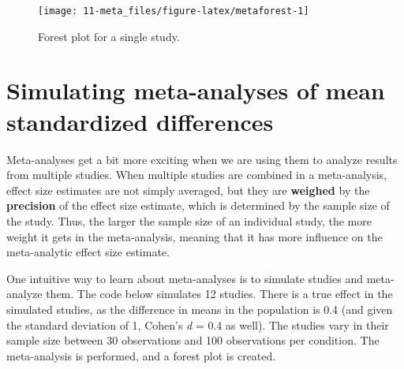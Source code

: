 \documentclass[
  oneside]{book}
\begin{document}
\begin{figure}

{\centering \texttt{[image: 11-meta\_files/figure-latex/metaforest-1]} 

}

\caption{Forest plot for a single study.}\label{fig:metaforest}
\end{figure}

\hypertarget{simulating-meta-analyses-of-mean-standardized-differences}{%
\section{Simulating meta-analyses of mean standardized differences}\label{simulating-meta-analyses-of-mean-standardized-differences}}

Meta-analyses get a bit more exciting when we are using them to analyze results from multiple studies. When multiple studies are combined in a meta-analysis, effect size estimates are not simply averaged, but they are \textbf{weighed} by the \textbf{precision} of the effect size estimate, which is determined by the sample size of the study. Thus, the larger the sample size of an individual study, the more weight it gets in the meta-analysis, meaning that it has more influence on the meta-analytic effect size estimate.

One intuitive way to learn about meta-analyses is to simulate studies and meta-analyze them. The code below simulates 12 studies. There is a true effect in the simulated studies, as the difference in means in the population is 0.4 (and given the standard deviation of 1, Cohen's \emph{d} = 0.4 as well). The studies vary in their sample size between 30 observations and 100 observations per condition. The meta-analysis is performed, and a forest plot is created.
\end{document}
